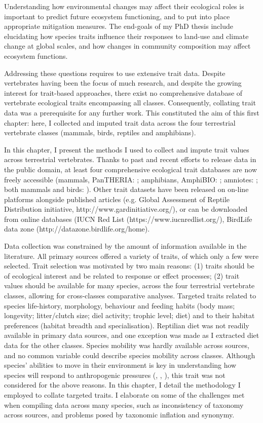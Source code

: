 Understanding how environmental changes may affect their ecological roles is important to predict future ecosystem functioning, and to put into place appropriate mitigation measures. The end-goals of my PhD thesis include elucidating how species traits influence their responses to land-use and climate change at global scales, and how changes in community composition may affect ecosystem functions.

Addressing these questions requires to use extensive trait data. Despite vertebrates having been the focus of much research, and despite the growing interest for trait-based approaches, there exist no comprehensive database of vertebrate ecological traits encompassing all classes. Consequently, collating trait data was a prerequisite for any further work. This constituted the aim of this first chapter: here, I collected and imputed trait data across the four terrestrial vertebrate classes (mammals, birds, reptiles and amphibians).

In this chapter, I present the methods I used to collect and impute trait values across terrestrial vertebrates. Thanks to past and recent efforts to release data in the public domain, at least four comprehensive ecological trait databases are now freely accessible (mammals, PanTHERIA: \cite{Jones2009}; amphibians, AmphiBIO: \cite{Oliveira2017}; amniotes: \cite{Myhrvold2015}; both mammals and birds: \cite{Cooke2019}). Other trait datasets have been released on on-line platforms alongside published articles (e.g. Global Assessment of Reptile Distribution initiative, http://www.gardinitiative.org/), or can be downloaded from online databases (IUCN Red List (https://www.iucnredlist.org/), BirdLife data zone (http://datazone.birdlife.org/home). 

Data collection was constrained by the amount of information available in the literature.  All  primary sources offered a variety of traits, of which only a few were selected. Trait selection was motivated by two main reasons: (1) traits should be of ecological interest and be related to response or effect processes; (2) trait values should be available for many species, across the four terrestrial vertebrate classes, allowing for cross-classes comparative analyses. Targeted traits related to species life-history, morphology, behaviour and feeding habits (body mass; longevity; litter/clutch size; diel activity; trophic level; diet) and to their habitat preferences (habitat breadth and specialisation). Reptilian diet was not readily available in primary data sources, and one exception was made as I extracted diet data for the other classes. Species mobility was hardly available across sources, and no common variable could describe species mobility across classes. Although species' abilities to move in their environment is key in understanding how species will respond to anthropogenic pressures (\cite{Schloss2012b}, \cite{Barbet-Massin2012}, \cite{Pearson2006}), this trait was not considered for the above reasons. In this chapter, I detail the methodology I employed to collate targeted traits. I elaborate on some of the challenges met when compiling data across many species, such as inconsistency of taxonomy across sources, and problems posed by taxonomic inflation and synonymy.

